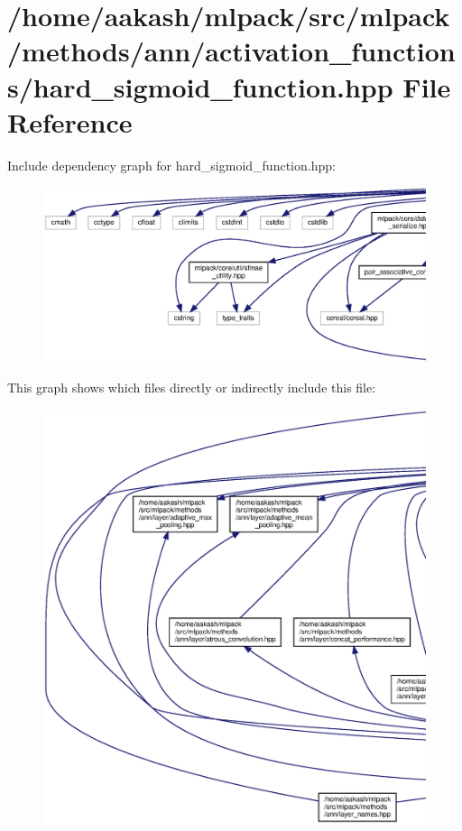 \section{/home/aakash/mlpack/src/mlpack/methods/ann/activation\+\_\+functions/hard\+\_\+sigmoid\+\_\+function.hpp File Reference}
\label{hard__sigmoid__function_8hpp}
Include dependency graph for hard\+\_\+sigmoid\+\_\+function.\+hpp\+:
\nopagebreak
\begin{figure}[H]
\begin{center}
\leavevmode
\includegraphics[width=350pt]{hard__sigmoid__function_8hpp__incl}
\end{center}
\end{figure}
This graph shows which files directly or indirectly include this file\+:
\nopagebreak
\begin{figure}[H]
\begin{center}
\leavevmode
\includegraphics[width=350pt]{hard__sigmoid__function_8hpp__dep__incl}
\end{center}
\end{figure}
